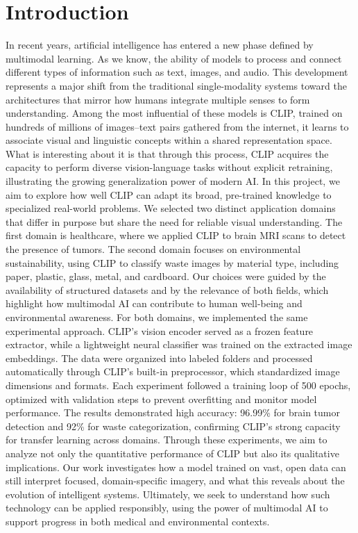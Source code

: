 \documentclass[12pt]{article}
\begin{document}
\section{Introduction}
In recent years, artificial intelligence has entered a new phase defined by multimodal learning. As we know, the ability of models to process and connect different types of information such as text, images, and audio. This development represents a major shift from the traditional single-modality systems toward the architectures that mirror how humans integrate multiple senses to form understanding. Among the most influential of these models is CLIP, trained on hundreds of millions of images–text pairs gathered from the internet, it learns to associate visual and linguistic concepts within a shared representation space. What is interesting about it is that through this process, CLIP acquires the capacity to perform diverse vision-language tasks without explicit retraining, illustrating the growing generalization power of modern AI.
In this project, we aim to explore how well CLIP can adapt its broad, pre-trained knowledge to specialized real-world problems. We selected two distinct application domains that differ in purpose but share the need for reliable visual understanding. The first domain is healthcare, where we applied CLIP to brain MRI scans to detect the presence of tumors. The second domain focuses on environmental sustainability, using CLIP to classify waste images by material type, including paper, plastic, glass, metal, and cardboard. Our choices were guided by the availability of structured datasets and by the relevance of both fields, which highlight how multimodal AI can contribute to human well-being and environmental awareness. For both domains, we implemented the same experimental approach. CLIP’s vision encoder served as a frozen feature extractor, while a lightweight neural classifier was trained on the extracted image embeddings. The data were organized into labeled folders and processed automatically through CLIP’s built-in preprocessor, which standardized image dimensions and formats. Each experiment followed a training loop of 500 epochs, optimized with validation steps to prevent overfitting and monitor model performance. The results demonstrated high accuracy: 96.99\% for brain tumor detection and 92\% for waste categorization, confirming CLIP’s strong capacity for transfer learning across domains. Through these experiments, we aim to analyze not only the quantitative performance of CLIP but also its qualitative implications. Our work investigates how a model trained on vast, open data can still interpret focused, domain-specific imagery, and what this reveals about the evolution of intelligent systems. Ultimately, we seek to understand how such technology can be applied responsibly, using the power of multimodal AI to support progress in both medical and environmental contexts.
\newpage
\end{document}
